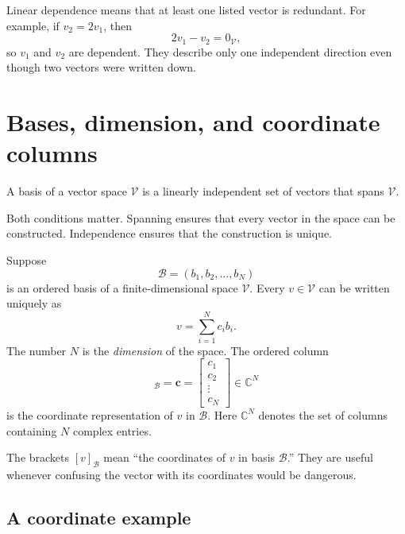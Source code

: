 Linear dependence means that at least one listed vector is redundant. For
example, if \(v_2=2v_1\), then
\begin{equation}
  2v_1-v_2=0_{\mathcal V},
\end{equation}
so \(v_1\) and \(v_2\) are dependent. They describe only one independent
direction even though two vectors were written down.

\section{Bases, dimension, and coordinate columns}

\begin{definition}[Basis]
A basis of a vector space \(\mathcal V\) is a linearly independent set of
vectors that spans \(\mathcal V\).
\end{definition}

Both conditions matter. Spanning ensures that every vector in the space can be
constructed. Independence ensures that the construction is unique.

Suppose
\begin{equation}
  \mathcal B=(b_1,b_2,\ldots,b_N)
\end{equation}
is an ordered basis of a finite-dimensional space \(\mathcal V\). Every
\(v\in\mathcal V\) can be written uniquely as
\begin{equation}
  v=\sum_{i=1}^{N}c_i b_i.
  \label{eq:training-coordinate-expansion}
\end{equation}
The number \(N\) is the \emph{dimension} of the space. The ordered column
\begin{equation}
  [v]_{\mathcal B}
  =\mathbf c
  =\begin{bmatrix}
    c_1\\c_2\\\vdots\\c_N
  \end{bmatrix}
  \in\mathbb C^N
  \label{eq:training-coordinate-column}
\end{equation}
is the coordinate representation of \(v\) in \(\mathcal B\). Here
\(\mathbb C^N\) denotes the set of columns containing \(N\) complex entries.

The brackets \([v]_{\mathcal B}\) mean ``the coordinates of \(v\) in basis
\(\mathcal B\).'' They are useful whenever confusing the vector with its
coordinates would be dangerous.

\subsection{A coordinate example}

